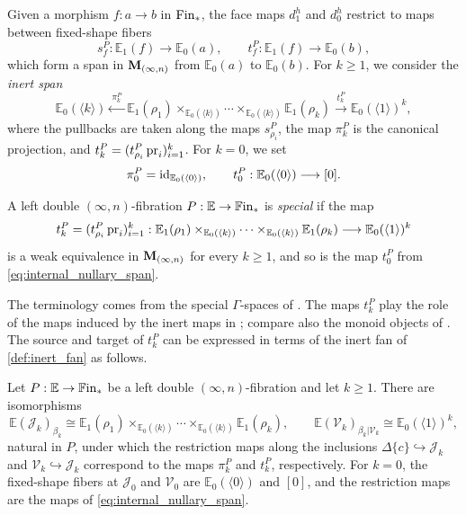 \documentclass[10pt,reqno]{amsart}
\begin{document}
Given a morphism $f:a\to b$ in $\mathrm{Fin}_*$, the face maps $d_1^h$ and
$d_0^h$ restrict to maps between fixed-shape fibers
\[
s_f^P:\mathbb E_1(f)\longrightarrow\mathbb E_0(a),
\qquad
t_f^P:\mathbb E_1(f)\longrightarrow\mathbb E_0(b),
\]
which form a span in $\mathbf M_{(\infty,n)}$ from $\mathbb E_0(a)$ to
$\mathbb E_0(b)$. For $k\geq1$, we consider the \emph{inert span}
\begin{equation}
\label{eq:segality_double_span}
\mathbb E_0(\langle k\rangle)
\xleftarrow{\ \pi_k^P\ }
\mathbb E_1(\rho_1)
\times_{\mathbb E_0(\langle k\rangle)}\cdots
\times_{\mathbb E_0(\langle k\rangle)}\mathbb E_1(\rho_k)
\xrightarrow{\ t_k^P\ }
\mathbb E_0(\langle1\rangle)^k,
\end{equation}
where the pullbacks are taken along the maps $s_{\rho_i}^P$, the map
$\pi_k^P$ is the canonical projection, and
$t_k^P=(t_{\rho_i}^P\operatorname{pr}_i)_{i=1}^k$. For $k=0$, we set
\begin{equation}
\label{eq:internal_nullary_span}
\pi_0^P=\operatorname{id}_{\mathbb E_0(\langle0\rangle)},
\qquad
t_0^P:\mathbb E_0(\langle0\rangle)\longrightarrow[0].
\end{equation}

\begin{definition}
\label{def:special_left_double}
A left double $(\infty,n)$-fibration
$P:\mathbb E\to\mathbb{F}\mathrm{in}_*$ is \emph{special} if the map
\[
t_k^P=(t_{\rho_i}^P\operatorname{pr}_i)_{i=1}^k:
\mathbb E_1(\rho_1)
\times_{\mathbb E_0(\langle k\rangle)}\cdots
\times_{\mathbb E_0(\langle k\rangle)}\mathbb E_1(\rho_k)
\longrightarrow\mathbb E_0(\langle1\rangle)^k
\]
is a weak equivalence in $\mathbf M_{(\infty,n)}$ for every $k\geq1$, and so is
the map $t_0^P$ from \eqref{eq:internal_nullary_span}.
\end{definition}

The terminology comes from the special $\Gamma$-spaces of
\cite{Seg74}. The maps $t_k^P$ play the role of the maps induced by
the inert maps in \cite[Definition~2.0.0.7]{LurieHA}; compare also the
monoid objects of \cite[\S2.4.2]{LurieHA}. The source and target of
$t_k^P$ can be expressed in terms of the inert fan of
\cref{def:inert_fan} as follows.

\begin{lemma}
\label{lem:internal_fan_identification}
Let $P:\mathbb E\to\mathbb{F}\mathrm{in}_*$ be a left double
$(\infty,n)$-fibration and let $k\geq1$. There are isomorphisms
\[
\mathbb E(\mathcal J_k)_{\beta_k}\cong
\mathbb E_1(\rho_1)
\times_{\mathbb E_0(\langle k\rangle)}\cdots
\times_{\mathbb E_0(\langle k\rangle)}\mathbb E_1(\rho_k),
\qquad
\mathbb E(\mathcal V_k)_{\beta_k|\mathcal V_k}
\cong\mathbb E_0(\langle1\rangle)^k,
\]
natural in $P$, under which the restriction maps along the
inclusions $\Delta\{c\}\hookrightarrow\mathcal J_k$ and
$\mathcal V_k\hookrightarrow\mathcal J_k$ correspond to the maps
$\pi_k^P$ and $t_k^P$, respectively. For $k=0$, the fixed-shape
fibers at $\mathcal J_0$ and $\mathcal V_0$ are
$\mathbb E_0(\langle0\rangle)$ and $[0]$, and the restriction maps
are the maps of \eqref{eq:internal_nullary_span}.
\end{lemma}
\end{document}
